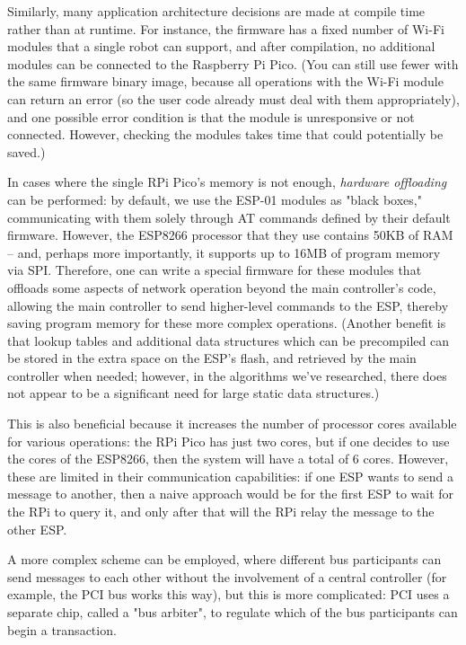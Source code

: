 \documentclass[%
]{article}
\begin{document}
Similarly, many application architecture decisions are made at compile time rather than at runtime.
For instance, the firmware has a fixed number of Wi-Fi modules that a single robot can support,
and after compilation, no additional modules can be connected to the Raspberry Pi Pico.
(You can still use fewer with the same firmware binary image, because all operations with the Wi-Fi module can return an error
(so the user code already must deal with them appropriately),
and one possible error condition is that the module is unresponsive or not connected.
However, checking the modules takes time that could potentially be saved.)

In cases where the single RPi Pico's memory is not enough,
\emph{hardware offloading} can be performed:
by default, we use the ESP-01 modules as "black boxes,"
communicating with them solely through AT commands defined by their default firmware.
However, the ESP8266 processor that they use contains 50KB of RAM --
and, perhaps more importantly, it supports up to 16MB of program memory via SPI.
Therefore, one can write a special firmware for these modules that offloads
some aspects of network operation beyond the main controller's code,
allowing the main controller to send higher-level commands to the ESP,
thereby saving program memory for these more complex operations.
(Another benefit is that lookup tables and additional data structures
which can be precompiled can be stored in the extra space on the ESP's flash,
and retrieved by the main controller when needed;
however, in the algorithms we've researched, there
does not appear to be a significant need for large static data structures.)

This is also beneficial because it increases the number
of processor cores available for various operations:
the RPi Pico has just two cores, but if one decides to use the cores of the ESP8266,
then the system will have a total of 6 cores.
However, these are limited in their communication capabilities:
if one ESP wants to send a message to another,
then a naive approach would be for the first ESP to wait for the RPi to query it, and only after that will the RPi relay the message to the other ESP.

A more complex scheme can be employed,
where different bus participants can send messages to each other
without the involvement of a central controller (for example, the PCI bus works this way), but this is more complicated:
PCI uses a separate chip, called a "bus arbiter",
to regulate which of the bus participants can begin a transaction.
\end{document}
